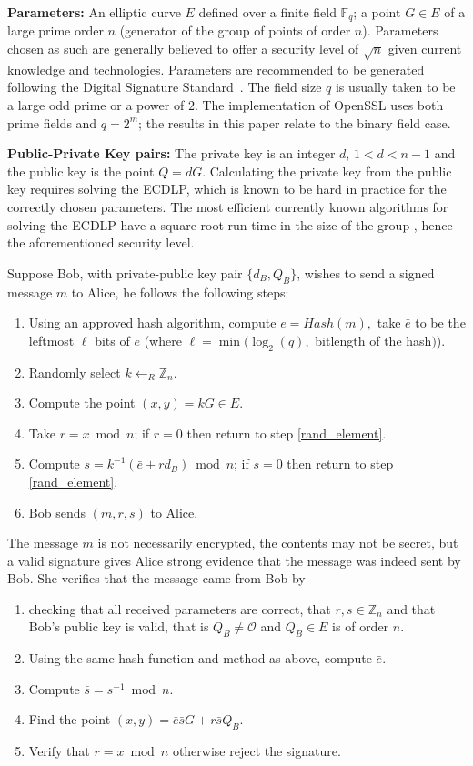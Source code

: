 \documentclass[twocolumn]{article}
\newcommand{\F}{{\mathbb F}}
\newcommand{\Z}{{\mathbb Z}}
\newcommand{\myupcase}[1]{\uppercase{#1}}
\begin{document}
{\bf{Parameters:}} An elliptic curve $E$ defined over a finite field $\F_{q}$; a point $G\in E$ of a large prime order $n$ (generator of the group of points of order $n$). Parameters chosen as such are generally believed to offer a security level of $\sqrt{n}$ given current knowledge and technologies. Parameters are recommended to be generated following the Digital Signature Standard~\cite{fips}. The field size $q$ is usually taken to be a large odd prime or a power of $2$. The implementation of OpenSSL uses both prime fields and $q=2^m$; the results in this paper relate to the binary field case.

{\bf{Public-Private Key pairs:}} The private key is an integer $d$, $1<d<n-1$ and the public key is the point $Q=dG$.
 Calculating the private key from the public key requires solving the \myupcase{ecdlp}, which is known to be hard in practice for the correctly chosen parameters.
 The most efficient currently known algorithms for solving the \myupcase{ecdlp} have a square root run time in the size of the 
group \cite{WienerZ98,GallantLV00}, hence the aforementioned security level.
\vspace{0.5cm}

Suppose Bob, with private-public key pair $\{d_B,Q_B\}$, wi\-shes to send a signed message $m$ to Alice, he follows the following steps:
\begin{enumerate}
\item Using an approved hash algorithm, compute $e=Hash(m),$ take $\bar{e}$ to be the leftmost $\ell$ bits of $e$ (where $\ell=\min(\log_2(q),$ bitlength of the hash$)$). 
\item\label{rand_element} Randomly select $k\leftarrow_R\Z_n$.
\item\label{scalar_mult} Compute the point $(x,y)=kG\in E$. 
\item Take $r=x\bmod n$; if $r=0$ then return to step \ref{rand_element}.
\item Compute $s=k^{-1}(\bar{e}+rd_B)\bmod n$; if $s=0$ then return to step \ref{rand_element}.
\item Bob sends $(m,r,s)$ to Alice.
\end{enumerate}
The message $m$ is not necessarily encrypted, the contents may not be secret, but a valid signature gives Alice strong evidence that the message was indeed sent by Bob. She verifies that the message came from Bob by 

\begin{enumerate}
\item checking that all received parameters are correct, that $r,s\in\Z_n$ and that Bob's public key is valid, that is $Q_B\neq \mathcal{O}$ and $Q_B\in E$ is of order $n$.
\item Using the same hash function and method as above, compute $\bar{e}$.
\item Compute $\bar{s}=s^{-1}\bmod n$.
\item Find the point $(x,y)=\bar{e}\bar{s}G+r\bar{s}Q_B$.
\item Verify that $r=x\bmod n$ otherwise reject the signature.
\end{enumerate}
\end{document}
